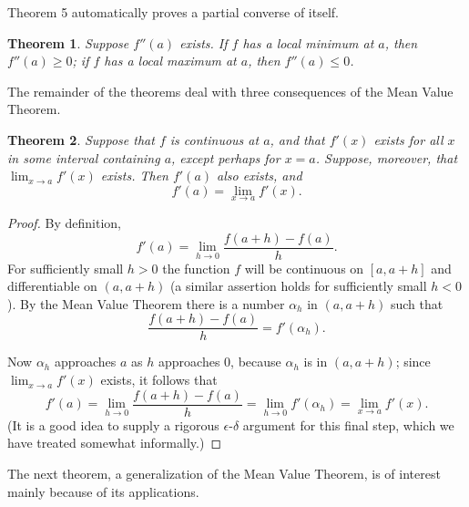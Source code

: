 \documentclass{article}
\newtheorem{theorem}{Theorem}
\begin{document}
Theorem 5 automatically proves a partial converse of itself.

\begin{theorem}
  Suppose $f''(a)$ exists. If $f$ has a local minimum at $a$, then $f''(a) \geq
  0$; if $f$ has a local maximum at $a$, then $f''(a) \leq 0$.
\end{theorem}

The remainder of the theorems deal with three consequences of the Mean Value
Theorem.

\begin{theorem}
  Suppose that $f$ is continuous at $a$, and that $f'(x)$ exists for all $x$ in
  some interval containing $a$, except perhaps for $x = a$. Suppose, moreover,
  that $\lim_{x \to a} f'(x)$ exists. Then $f'(a)$ also exists, and \[
    f'(a) = \lim_{x \to a} f'(x).
  \]
\end{theorem}

\begin{proof}
  By definition, \[
    f'(a) = \lim_{h \to 0} \frac{f(a + h) - f(a)}{h}.
  \] For sufficiently small $h > 0$ the function $f$ will be continuous on
  $[a, a + h]$ and differentiable on $(a, a + h)$ (a similar assertion holds
  for sufficiently small $h < 0$). By the Mean Value Theorem there is a number
  $\alpha_h$ in $(a, a + h)$ such that \[
    \frac{f(a + h) - f(a)}{h} = f'(\alpha_h).
  \]

  Now $\alpha_h$ approaches $a$ as $h$ approaches 0, because $\alpha_h$ is in
  $(a, a + h)$; since $\lim_{x \to a} f'(x)$ exists, it follows that \[
    f'(a)
    = \lim_{h \to 0} \frac{f(a + h) - f(a)}{h}
    = \lim_{h \to 0} f'(\alpha_h)
    = \lim_{x \to a} f'(x).
  \] (It is a good idea to supply a rigorous $\epsilon$-$\delta$ argument for
  this final step, which we have treated somewhat informally.)
\end{proof}

The next theorem, a generalization of the Mean Value Theorem, is of interest
mainly because of its applications.
\end{document}
